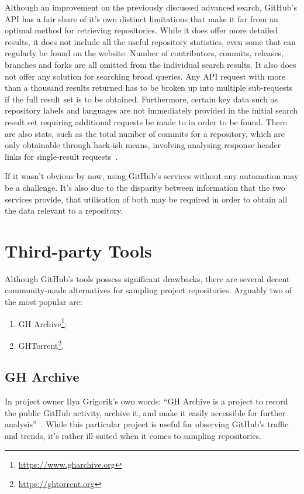 Although an improvement on the previously discussed advanced search, GitHub's API has a fair share of it's own distinct limitations that make it far from an optimal method for retrieving repositories.
While it does offer more detailed results, it does not include all the useful repository statistics, even some that can regularly be found on the website.
Number of contributors, commits, releases, branches and forks are all omitted from the individual search results.
It also does not offer any solution for searching broad queries.
Any API request with more than a thousand results returned has to be broken up into multiple sub-requests if the full result set is to be obtained.
Furthermore, certain key data such as repository labels and languages are not immediately provided in the initial search result set requiring additional requests be made to in order to be found.
There are also stats, such as the total number of commits for a repository, which are only obtainable through hack-ish means, involving analysing response header links for single-result requests~\cite{GIST1}.

If it wasn't obvious by now, using GitHub's services without any automation may be a challenge.
It's also due to the disparity between information that the two services provide, that utilisation of both may be required in order to obtain all the data relevant to a repository.

\section{Third-party Tools}

Although GitHub's tools possess significant drawbacks, there are several decent community-made alternatives for sampling project repositories.
Arguably two of the most popular are:
\begin{enumerate}
    \item GH Archive\footnote{\url{https://www.gharchive.org}};
    \item GHTorrent\footnote{\url{https://ghtorrent.org}}.
\end{enumerate}

\subsection{GH Archive}

In project owner Ilya Grigorik's own words: ``GH Archive is a project to record the public GitHub activity, archive it, and make it easily accessible for further analysis''~\cite{GHA}.
While this particular project is useful for observing GitHub's traffic and trends, it's rather ill-suited when it comes to sampling repositories.

